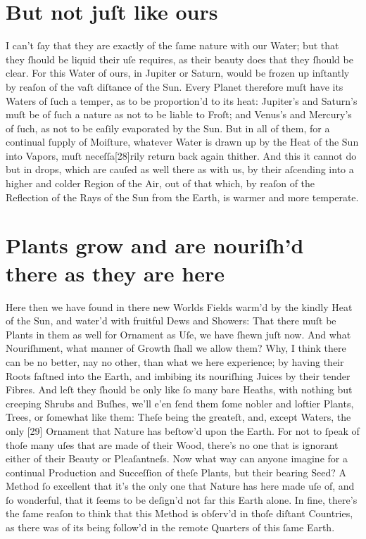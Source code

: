 \documentclass[letterpaper]{book}
\begin{document}
\section{But not juſt like ours}

I can't ſay that they are exactly of the ſame nature with our Water; but
that they ſhould be liquid their uſe requires, as their beauty does that they
ſhould be clear. For this Water of ours, in Jupiter or Saturn, would be
frozen up inſtantly by reaſon of the vaſt diſtance of the Sun. Every Planet
therefore muſt have its Waters of ſuch a temper, as to be proportion'd to
its heat: Jupiter's and Saturn's muſt be of ſuch a nature as not to be liable
to Froſt; and Venus's and Mercury's of ſuch, as not to be eaſily evaporated
by the Sun. But in all of them, for a continual ſupply of Moiſture, whatever
Water is drawn up by the Heat of the Sun into Vapors, muſt neceſſa[28]rily
return back again thither. And this it cannot do but in drops, which are
cauſed as well there as with us, by their aſcending into a higher and colder
Region of the Air, out of that which, by reaſon of the Reflection of the Rays
of the Sun from the Earth, is warmer and more temperate.


\section{Plants grow and are nouriſh'd there as they are here}

Here then we have found in there new Worlds Fields warm'd by the kindly Heat
of the Sun, and water'd with fruitful Dews and Showers: That there muſt be
Plants in them as well for Ornament as Uſe, we have ſhewn juſt now. And what
Nouriſhment, what manner of Growth ſhall we allow them?  Why, I think there
can be no better, nay no other, than what we here experience; by having
their Roots faſtned into the Earth, and imbibing its nouriſhing Juices by
their tender Fibres. And leſt they ſhould be only like ſo many bare Heaths,
with nothing but creeping Shrubs and Buſhes, we'll e'en ſend them ſome
nobler and loftier Plants, Trees, or ſomewhat like them: Theſe being the
greateſt, and, except Waters, the only [29] Ornament that Nature has
beſtow'd upon the Earth. For not to ſpeak of thoſe many uſes that are made
of their Wood, there's no one that is ignorant either of their Beauty or
Pleaſantneſs. Now what way can anyone imagine for a continual Production and
Succeſſion of theſe Plants, but their bearing Seed? A Method ſo excellent
that it's the only one that Nature has here made uſe of, and ſo wonderful,
that it ſeems to be deſign'd not far this Earth alone. In fine, there's the
ſame reaſon to think that this Method is obſerv'd in thoſe diſtant
Countries, as there was of its being follow'd in the remote Quarters of this
ſame Earth.
\end{document}
